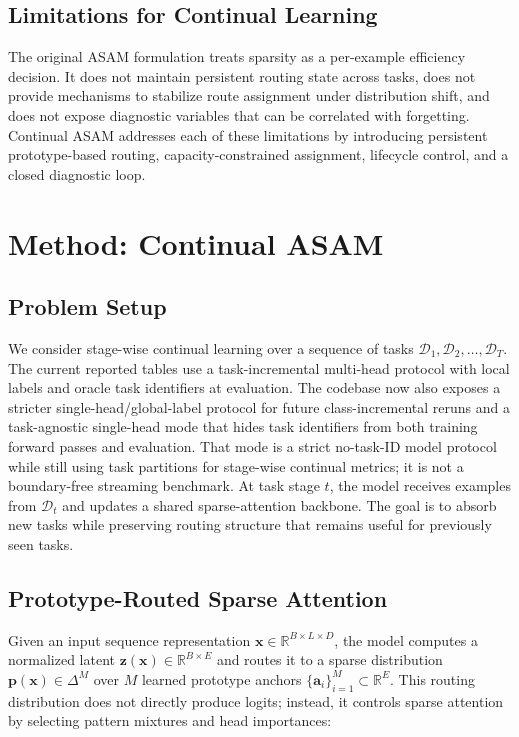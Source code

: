 \documentclass[11pt,a4paper]{article}
\theoremstyle{definition}
\begin{document}
\subsection{Limitations for Continual Learning}

The original ASAM formulation treats sparsity as a per-example efficiency decision. It does not maintain persistent routing state across tasks, does not provide mechanisms to stabilize route assignment under distribution shift, and does not expose diagnostic variables that can be correlated with forgetting. Continual ASAM addresses each of these limitations by introducing persistent prototype-based routing, capacity-constrained assignment, lifecycle control, and a closed diagnostic loop.

\section{Method: Continual ASAM}
\label{sec:method}

\subsection{Problem Setup}

We consider stage-wise continual learning over a sequence of tasks $\mathcal{D}_1, \mathcal{D}_2, \dots, \mathcal{D}_T$. The current reported tables use a task-incremental multi-head protocol with local labels and oracle task identifiers at evaluation. The codebase now also exposes a stricter single-head/global-label protocol for future class-incremental reruns and a task-agnostic single-head mode that hides task identifiers from both training forward passes and evaluation. That mode is a strict no-task-ID model protocol while still using task partitions for stage-wise continual metrics; it is not a boundary-free streaming benchmark. At task stage $t$, the model receives examples from $\mathcal{D}_t$ and updates a shared sparse-attention backbone. The goal is to absorb new tasks while preserving routing structure that remains useful for previously seen tasks.

\subsection{Prototype-Routed Sparse Attention}

Given an input sequence representation $\mathbf{x} \in \mathbb{R}^{B \times L \times D}$, the model computes a normalized latent $\mathbf{z}(\mathbf{x}) \in \mathbb{R}^{B \times E}$ and routes it to a sparse distribution $\mathbf{p}(\mathbf{x}) \in \Delta^{M}$ over $M$ learned prototype anchors $\{\mathbf{a}_i\}_{i=1}^{M} \subset \mathbb{R}^{E}$. This routing distribution does not directly produce logits; instead, it controls sparse attention by selecting pattern mixtures and head importances:
\end{document}
